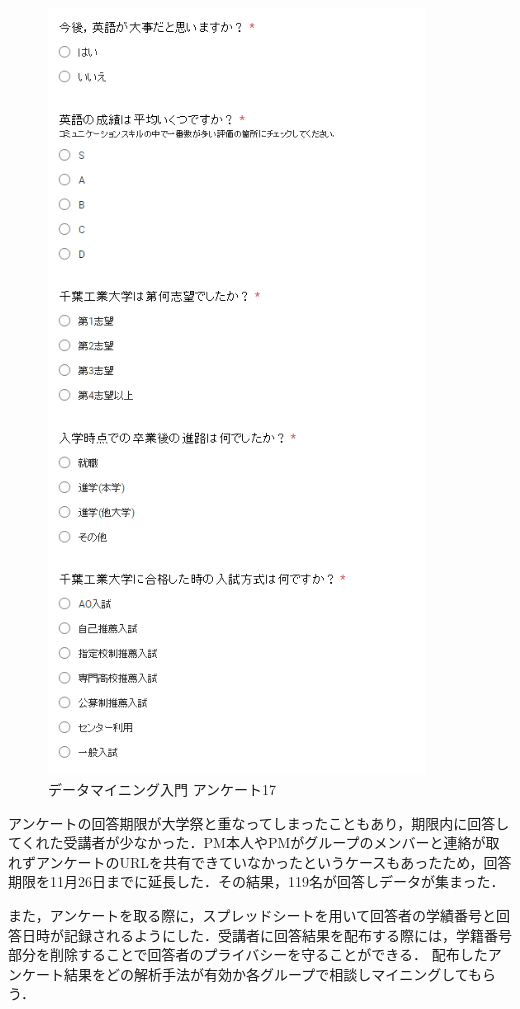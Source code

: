 \begin{figure}[p]
\centering
\includegraphics[width=10cm]{forms17.PNG}
\caption{データマイニング入門 アンケート17}\label{サンプル図}
\end{figure}

\newpage

アンケートの回答期限が大学祭と重なってしまったこともあり，期限内に回答してくれた受講者が少なかった．PM本人やPMがグループのメンバーと連絡が取れずアンケートのURLを共有できていなかったというケースもあったため，回答期限を11月26日までに延長した．その結果，119名が回答しデータが集まった．

また，アンケートを取る際に，スプレッドシートを用いて回答者の学績番号と回答日時が記録されるようにした．受講者に回答結果を配布する際には，学籍番号部分を削除することで回答者のプライバシーを守ることができる．
配布したアンケート結果をどの解析手法が有効か各グループで相談しマイニングしてもらう．

